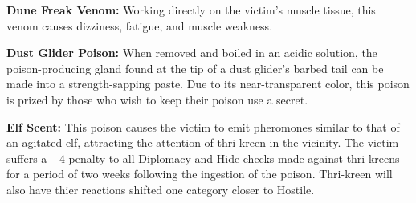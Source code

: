 
\textbf{Dune Freak Venom:} Working directly on the victim's muscle tissue, this venom causes dizziness, fatigue, and muscle weakness.

\textbf{Dust Glider Poison:} When removed and boiled in an acidic solution, the poison-producing gland found at the tip of a dust glider's barbed tail can be made into a strength-sapping paste. Due to its near-transparent color, this poison is prized by those who wish to keep their poison use a secret.

\textbf{Elf Scent:} This poison causes the victim to emit pheromones similar to that of an agitated elf, attracting the attention of thri-kreen in the vicinity. The victim suffers a $-4$ penalty to all Diplomacy and Hide checks made against thri-kreens for a period of two weeks following the ingestion of the poison. Thri-kreen will also have thier reactions shifted one category closer to Hostile.

